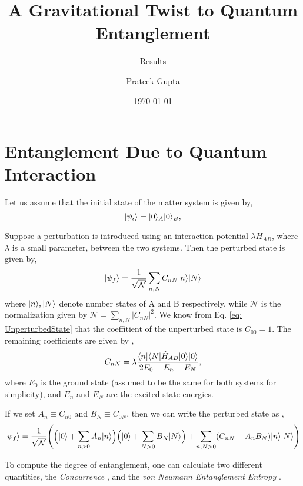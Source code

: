 \documentclass[11pt]{article}
\title{A Gravitational Twist to Quantum Entanglement}
\subtitle{Results}
\author{Prateek Gupta}
\date{\today}
\DeclarePairedDelimiter\bra{\langle}{\rvert}
\DeclarePairedDelimiter\ket{\lvert}{\rangle}
\begin{document}
\maketitle{}

\section{Entanglement Due to Quantum Interaction}

Let us assume that the initial state of the matter system is given by,
\begin{equation}
    \ket{\psi_i} = \ket{0}_A\ket{0}_B,
    \label{eq: UnperturbedState}
\end{equation}


Suppose a perturbation is introduced using an interaction potential $\lambda H_{AB}$, where $\lambda$ is a small parameter, between the two systems. Then the perturbed state is given by,
\begin{equation}
    \ket{\psi_f} = \frac{1}{\sqrt{\mathcal{N}}} \sum_{n,N} C_{nN} \ket{n}\ket{N} 
    \label{eq: FinalState}
\end{equation}
where $\ket{n}, \ket{N}$ denote number states of A and B respectively, while $\mathcal{N}$ is the normalization given by $\mathcal{N} = \sum_{n,N} |C_{nN}|^2$. We know from Eq. \ref{eq: UnperturbedState} that the coeffitient of the unperturbed state is $C_{00} = 1$. The remaining coefficients are given by \cite{Bose_2022, Bala_2012},
\begin{equation}
    C_{nN} = \lambda\frac{\bra{n}\bra{N}\hat{H}_{AB}\ket{0}\ket{0}}{2E_0 - E_n - E_N},
    \label{eq: CoeffCalc}
\end{equation}
where $E_0$ is the ground state (assumed to be the same for both systems for simplicity), and $E_n$ and $E_N$ are the excited state energies.

If we set $A_n \equiv C_{n0}$ and $B_N \equiv C_{0N}$, then we can write the perturbed state as \cite{Bala_2012},
\begin{equation}
    \begin{aligned}
        \ket{\psi_f} &= \frac{1}{\sqrt{\mathcal{N}}} \Bigg( \Big(\ket{0} + \sum_{n>0} A_n \ket{n}\Big)\Big(\ket{0} + \sum_{N>0} B_N \ket{N}\Big) + \sum_{n, N > 0} (C_{nN} - A_nB_N) \ket{n}\ket{N} \Bigg)\\
    \end{aligned}
\end{equation}


To compute the degree of entanglement, one can calculate two different quantities, the \textit{Concurrence} \cite{PhysRevLett.78.5022, PhysRevA.64.042315}, and the \textit{von Neumann Entanglement Entropy} \cite{Bala_2012, PhysRevA.101.052110}.
\end{document}
